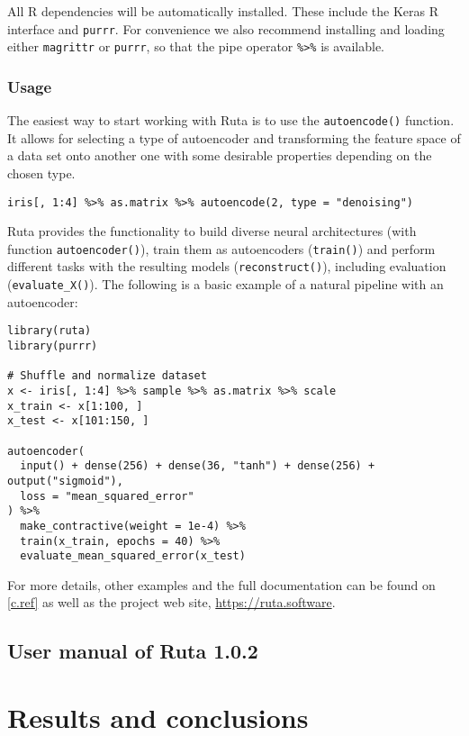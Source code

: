 \documentclass[oneside,openright,titlepage,numbers=noenddot,openany,headinclude,footinclude=true,
cleardoublepage=empty,abstractoff,BCOR=5mm,paper=a4,fontsize=12pt,main=spanish]{scrreprt}
\begin{document}
All R dependencies will be automatically installed. These include the Keras R interface and \texttt{purrr}. For convenience we also recommend installing and loading either \texttt{magrittr} or \texttt{purrr}, so that the pipe operator \texttt{\%>\%} is available.

\section{Usage}

The easiest way to start working with Ruta is to use the \texttt{autoencode()} function. It allows for selecting a type of autoencoder and transforming the feature space of a data set onto another one with some desirable properties depending on the chosen type.
\begin{verbatim}
iris[, 1:4] %>% as.matrix %>% autoencode(2, type = "denoising")  
\end{verbatim}

Ruta provides the functionality to build diverse neural architectures (with function \texttt{autoencoder()}), train them as autoencoders (\texttt{train()}) and perform different tasks with the resulting models (\texttt{reconstruct()}), including evaluation (\texttt{evaluate\_X()}). The following is a basic example of a natural pipeline with an autoencoder:
\begin{verbatim}
library(ruta)
library(purrr)

# Shuffle and normalize dataset
x <- iris[, 1:4] %>% sample %>% as.matrix %>% scale
x_train <- x[1:100, ]
x_test <- x[101:150, ]

autoencoder(
  input() + dense(256) + dense(36, "tanh") + dense(256) + output("sigmoid"),
  loss = "mean_squared_error"
) %>%
  make_contractive(weight = 1e-4) %>%
  train(x_train, epochs = 40) %>%
  evaluate_mean_squared_error(x_test)
\end{verbatim}

For more details, other examples and the full documentation can be found on \autoref{c.ref} as well as the project web site, \url{https://ruta.software}.

\chapter{User manual of Ruta 1.0.2}
\label{c.ref}



\part{Results and conclusions}
\label{p.final}
\end{document}
